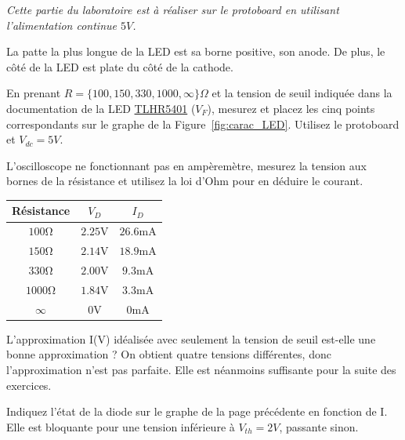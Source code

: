 \documentclass{../template/labo}
\begin{document}
\begin{manip}
	
\textit{Cette partie du laboratoire est à réaliser sur le protoboard en utilisant l'alimentation continue $5V$.}

\begin{astuce}
	La patte la plus longue de la LED est sa borne positive, son anode.
	De plus, le côté de la LED est plate du côté de la cathode.
\end{astuce}


	
\Question
{\label{Q:1}
	En prenant $R=\lbrace 100, 150, 330, 1000, \infty \rbrace \Omega$ et la tension de seuil indiquée dans la documentation de la LED \href{http://www.vishay.com/docs/83012/tlhg540.pdf}{TLHR5401} ($V_F$), mesurez et placez les cinq points correspondants sur le graphe de la Figure~\vref{fig:carac_LED}. Utilisez le protoboard et $V_{dc}=5V$.

	\begin{astuce}
		L'oscilloscope ne fonctionnant pas en ampèremètre, mesurez la tension aux bornes de la résistance et utilisez la loi d'Ohm pour en déduire le courant.
	\end{astuce}
}
{
\begin{center}
	\begin{tabular}{ccc}
		Résistance & $V_D$ & $I_D$ \\\toprule
		$100 \si{\ohm}$ & $2.25 \si{\volt}$ & $26.6 \si{\milli\ampere}$ \\\midrule
		$150 \si{\ohm}$ & $2.14 \si{\volt}$ & $18.9 \si{\milli\ampere}$ \\\midrule
		$330 \si{\ohm}$ & $2.00 \si{\volt}$ & $9.3 \si{\milli\ampere}$ \\\midrule
		$1000 \si{\ohm}$ & $1.84 \si{\volt}$ & $3.3 \si{\milli\ampere}$ \\\midrule
		$\infty$ & $0 \si{\volt}$ & $0 \si{\milli\ampere}$ \\\bottomrule
	\end{tabular}
\end{center}
}%

\Question
{
	L'approximation I(V) idéalisée avec seulement la tension de seuil est-elle une bonne approximation ?
}
{On obtient quatre tensions différentes, donc l'approximation n'est pas parfaite.
Elle est néanmoins suffisante pour la suite des exercices.}%
	\label{Q:2}

\Question
{
	Indiquez l'état de la diode sur le graphe de la page précédente en fonction de I.
}
{Elle est bloquante pour une tension inférieure à $V_{th} = 2 V$, passante sinon.}
	\label{Q:3}
	

\end{manip}
\end{document}
